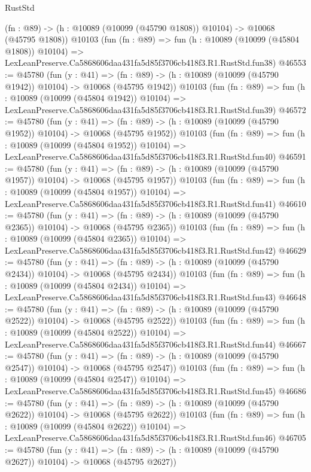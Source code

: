 \begin{lexlean}{RustStd}
\begin{coremodule}
    (fn : @89) -> (h : @10089 (@10099 (@45790 @1808)) @10104) -> @10068 (@45795 @1808))
    @10103
    (fun (fn : @89) =>
    fun (h : @10089 (@10099 (@45804 @1808)) @10104) =>
    LexLeanPreserve.Ca5868606daa431fa5d85f3706cb418f3.R1.RustStd.fun38)
@46553 := @45780
    (fun (y : @41) =>
    (fn : @89) -> (h : @10089 (@10099 (@45790 @1942)) @10104) -> @10068 (@45795 @1942))
    @10103
    (fun (fn : @89) =>
    fun (h : @10089 (@10099 (@45804 @1942)) @10104) =>
    LexLeanPreserve.Ca5868606daa431fa5d85f3706cb418f3.R1.RustStd.fun39)
@46572 := @45780
    (fun (y : @41) =>
    (fn : @89) -> (h : @10089 (@10099 (@45790 @1952)) @10104) -> @10068 (@45795 @1952))
    @10103
    (fun (fn : @89) =>
    fun (h : @10089 (@10099 (@45804 @1952)) @10104) =>
    LexLeanPreserve.Ca5868606daa431fa5d85f3706cb418f3.R1.RustStd.fun40)
@46591 := @45780
    (fun (y : @41) =>
    (fn : @89) -> (h : @10089 (@10099 (@45790 @1957)) @10104) -> @10068 (@45795 @1957))
    @10103
    (fun (fn : @89) =>
    fun (h : @10089 (@10099 (@45804 @1957)) @10104) =>
    LexLeanPreserve.Ca5868606daa431fa5d85f3706cb418f3.R1.RustStd.fun41)
@46610 := @45780
    (fun (y : @41) =>
    (fn : @89) -> (h : @10089 (@10099 (@45790 @2365)) @10104) -> @10068 (@45795 @2365))
    @10103
    (fun (fn : @89) =>
    fun (h : @10089 (@10099 (@45804 @2365)) @10104) =>
    LexLeanPreserve.Ca5868606daa431fa5d85f3706cb418f3.R1.RustStd.fun42)
@46629 := @45780
    (fun (y : @41) =>
    (fn : @89) -> (h : @10089 (@10099 (@45790 @2434)) @10104) -> @10068 (@45795 @2434))
    @10103
    (fun (fn : @89) =>
    fun (h : @10089 (@10099 (@45804 @2434)) @10104) =>
    LexLeanPreserve.Ca5868606daa431fa5d85f3706cb418f3.R1.RustStd.fun43)
@46648 := @45780
    (fun (y : @41) =>
    (fn : @89) -> (h : @10089 (@10099 (@45790 @2522)) @10104) -> @10068 (@45795 @2522))
    @10103
    (fun (fn : @89) =>
    fun (h : @10089 (@10099 (@45804 @2522)) @10104) =>
    LexLeanPreserve.Ca5868606daa431fa5d85f3706cb418f3.R1.RustStd.fun44)
@46667 := @45780
    (fun (y : @41) =>
    (fn : @89) -> (h : @10089 (@10099 (@45790 @2547)) @10104) -> @10068 (@45795 @2547))
    @10103
    (fun (fn : @89) =>
    fun (h : @10089 (@10099 (@45804 @2547)) @10104) =>
    LexLeanPreserve.Ca5868606daa431fa5d85f3706cb418f3.R1.RustStd.fun45)
@46686 := @45780
    (fun (y : @41) =>
    (fn : @89) -> (h : @10089 (@10099 (@45790 @2622)) @10104) -> @10068 (@45795 @2622))
    @10103
    (fun (fn : @89) =>
    fun (h : @10089 (@10099 (@45804 @2622)) @10104) =>
    LexLeanPreserve.Ca5868606daa431fa5d85f3706cb418f3.R1.RustStd.fun46)
@46705 := @45780
    (fun (y : @41) =>
    (fn : @89) -> (h : @10089 (@10099 (@45790 @2627)) @10104) -> @10068 (@45795 @2627))

\end{coremodule}
\end{lexlean}
